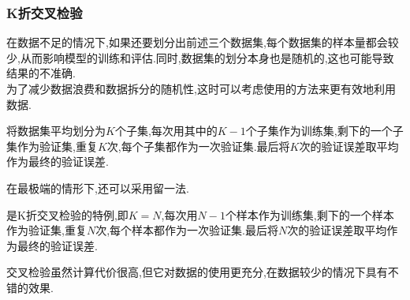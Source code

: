 \documentclass{ctexart}
\begin{document}
\subsubsection{K折交叉检验}
在数据不足的情况下,如果还要划分出前述三个数据集,每个数据集的样本量都会较少,从而影响模型的训练和评估.同时,数据集的划分本身也是随机的,这也可能导致结果的不准确.\\
\indent 为了减少数据浪费和数据拆分的随机性,这时可以考虑使用的方法来更有效地利用数据.
\begin{definition}[K折交叉检验]
    将数据集平均划分为$K$个子集,每次用其中的$K-1$个子集作为训练集,剩下的一个子集作为验证集,重复$K$次,每个子集都作为一次验证集.最后将$K$次的验证误差取平均作为最终的验证误差.
\end{definition}
在最极端的情形下,还可以采用留一法.
\begin{definition}[留一法]
    是K折交叉检验的特例,即$K=N$,每次用$N-1$个样本作为训练集,剩下的一个样本作为验证集,重复$N$次,每个样本都作为一次验证集.最后将$N$次的验证误差取平均作为最终的验证误差.
\end{definition}
交叉检验虽然计算代价很高,但它对数据的使用更充分,在数据较少的情况下具有不错的效果.
\end{document}
